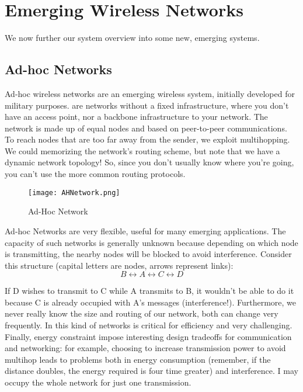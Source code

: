 \chapter{Emerging Wireless Networks}
We now further our system overview into some new, emerging systems.

\section{Ad-hoc Networks}
Ad-hoc wireless networks are an emerging wireless system, initially 
developed for military purposes.  are networks without
a fixed infrastructure, where you don't have an access point, nor a backbone 
infrastructure to your network. The network is made up of equal nodes and based 
on peer-to-peer communications. To reach nodes that are too far away from the 
sender, we exploit multihopping. We could memorizing the network's routing 
scheme, but note that we have a dynamic network topology! So, since you don't 
usually know where you're going, you can't use the more common routing 
protocols. 

\begin{figure}[t]
  \centering
  \texttt{[image: AHNetwork.png]}
  \caption{Ad-Hoc Network}				
  \label{fig:ewn:AHNetwork}
\end{figure}

Ad-hoc Networks are very flexible, useful for many emerging 
applications. The capacity of such networks is generally unknown because 
depending on which node is transmitting, the nearby nodes will be blocked to 
avoid interference. 
Consider this structure (capital letters are nodes, arrows represent 
links):
\begin{equation*}
B \leftrightarrow A \leftrightarrow C \leftrightarrow D
\end{equation*}

If D wishes to transmit to C while A transmits to B, it wouldn't be able 
to do it because C is already occupied with A's messages (interference!).
Furthermore, we never really know the size and routing of our network, 
both can change very frequently.
In this kind of networks \textbf{} is critical
for efficiency and very challenging.
Finally, energy constraint impose interesting design tradeoffs for 
communication and networking: for example, choosing to increase transmission 
power to avoid multihop leads to problems both in energy consumption (remember, 
if the distance doubles, the energy required is four time greater) and
interference. I may occupy the whole network for just one transmission. 

